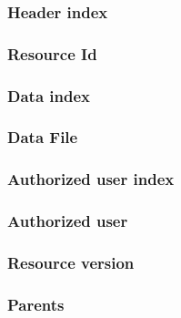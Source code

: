 \hypertarget{fields:header-index}{\subsubsection{Header index}}



\hypertarget{fields:resource-id}{\subsubsection{Resource Id}}

\hypertarget{fields:data-index}{\subsubsection{Data index}}

\hypertarget{fields:data-file}{\subsubsection{Data File}}

\hypertarget{fields:auth-user-index}{\subsubsection{Authorized user index}}

\hypertarget{fields:auth-user}{\subsubsection{Authorized user}}

\hypertarget{fields:version}{\subsubsection{Resource version}}

\hypertarget{fields:parents}{\subsubsection{Parents}}





